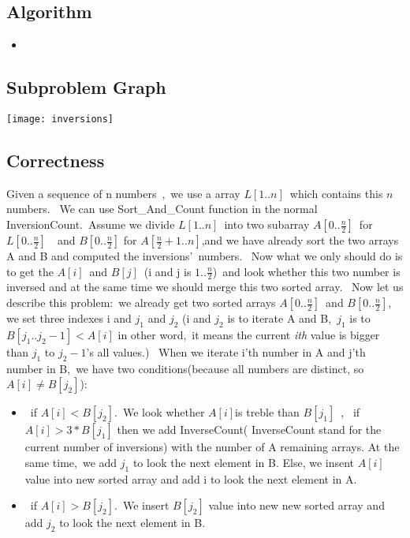 \documentclass{article}
\newcommand{\pythonscript}[2]{
\begin{itemize}
\item[]
\end{itemize}
}
\begin{document}
    \subsection{Algorithm}
    \pythonscript{significant_inversion}{Get a number list significant inversion}
    \subsection{Subproblem Graph}
        \begin{center}
            \texttt{[image: inversions]} %
        \end{center}
    \subsection{Correctness}
    Given a sequence of n numbers , we use a array $L[1..n]$ which contains this $n$ numbers. 
    We can use Sort\_And\_Count function in the normal InversionCount. Assume we divide $L[1..n]$ into two subarray $A[0..\frac{n}{2}]$ for $L[0..\frac{n}{2}]$  and $B[0..\frac{n}{2}]$ for $A[\frac{n}{2}+1..n]$,and we have already sort the two arrays A and B and computed the inversions’ numbers.
     Now what we only should do is to get the $A[i]$ and $B[j]$ (i and j is $1..\frac{n}{2}$) and look whether this two number is inversed and at the same time we should merge this two sorted array. 
    Now let us describe this problem: we already get two sorted arrays $A[0..\frac{n}{2}]$ and 
    $B[0..\frac{n}{2}]$, we set three indexes i and $j_1$ and $j_2$ (i and $j_2$ is to iterate A and B, $j_1$ is to $B[j_1..j_2 - 1] < A[i]$  
    in other word, it means the current \emph{ith} value is bigger than $j_1$ to $j_2 - 1$’s all values.) 
    When we iterate i’th number in A and j’th number in B, we have two conditions(because all numbers are distinct, so $A[i]\neq B[j_2]$):
    \begin{itemize}
        \item if $A[i] < B[j_2]$. We look whether $A[i]$is treble than $B[j_1]$ , 
        if $A[i] > 3*B[j_1]$ then we add InverseCount( InverseCount stand for the current number of inversions) with the number of A remaining arrays. At the same time, we add $j_1$ to look the next element in B. 
        Else, we insent $A[i]$ value into new sorted array and add i to look the next element in A.   
        \item if $A[i]>B[j_2]$. We insert $B[j_2]$ value into new new sorted array and add $j_2$ to look the next element in B.
    \end{itemize}
\end{document}
